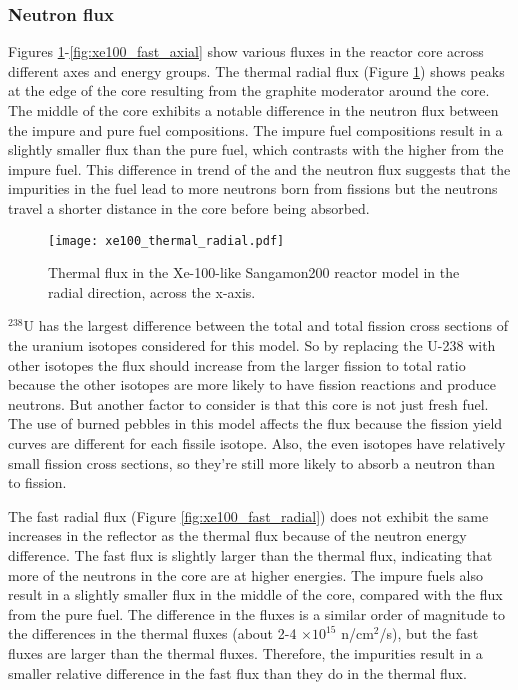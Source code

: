 \subsubsection{Neutron flux}
Figures \ref{fig:xe100_thermal_radial}-\ref{fig:xe100_fast_axial} show 
various fluxes in the reactor core across different axes and energy 
groups. The thermal radial flux (Figure \ref{fig:xe100_thermal_radial})
shows peaks at the edge of the core resulting from the graphite moderator 
around the core. The middle of the core exhibits a notable 
difference in the neutron flux between the impure and pure fuel 
compositions. The impure fuel compositions result in a slightly 
smaller flux than the pure fuel, which contrasts with the higher 
\keff from the impure fuel. This difference in trend of the \keff and 
the neutron flux suggests that the impurities in the fuel lead to 
more neutrons born from fissions but the neutrons travel a shorter 
distance in the core before being absorbed. 

\begin{figure}[ht]
        \centering 
        \texttt{[image: xe100\_thermal\_radial.pdf]}
        \caption{Thermal flux in the Xe-100-like Sangamon200 
        reactor model in the radial direction, across the 
        x-axis.}
        \label{fig:xe100_thermal_radial}
\end{figure}

$^{238}$U has the largest difference between the total and total 
fission cross sections of the uranium isotopes considered for this model. 
So by replacing the U-238 with other isotopes the flux should 
increase from the larger fission to total ratio because the other isotopes 
are more likely to have fission reactions and produce neutrons. But 
another factor to consider is that this core is not just fresh fuel. 
The use of burned pebbles in this model affects the flux because the 
fission yield curves are different for each fissile isotope. 
Also, the even isotopes have relatively small fission cross sections, 
so they're still more likely to absorb a neutron than to fission. 




The fast radial flux (Figure \ref{fig:xe100_fast_radial}) does not 
exhibit the same increases in the reflector as the thermal flux 
because of the neutron energy difference. The fast flux is slightly 
larger than the thermal flux, indicating that more of the neutrons 
in the core are at higher energies. The impure fuels also result in a 
slightly smaller flux in the middle of the core, compared with the  
flux from the pure fuel. The difference in the fluxes is a similar 
order of magnitude to the differences in the thermal fluxes (about 
2-4 $\times 10^{15}$ n/cm$^2$/s), but the fast fluxes are larger than 
the thermal fluxes. Therefore, the impurities result in a smaller 
relative difference in the fast flux than they do in the thermal 
flux. 

